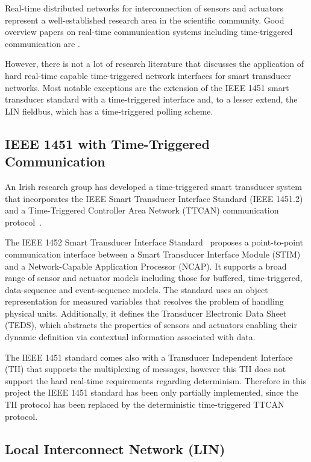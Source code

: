 \documentclass[11pt,a4paper,]{article}
\begin{document}
Real-time distributed networks for interconnection of sensors and
actuators represent a well-established research area in the
scientific community. Good overview papers on real-time
communication systems including time-triggered communication are
\cite{rushby03:buscompare,zurawski:05:ict,berge:00,jordan:95}.

However, there is not a lot of research literature that discusses
the application of hard real-time capable time-triggered network
interfaces for smart transducer networks. Most notable exceptions
are the extension of the IEEE 1451 smart transducer standard with
a time-triggered interface and, to a lesser extend, the LIN fieldbus, which has a time-triggered polling
scheme.

\subsection{IEEE 1451 with Time-Triggered Communication}

An Irish research group has developed a time-triggered smart
transducer system that incorporates the IEEE Smart Transducer
Interface Standard (IEEE 1451.2) and a Time-Triggered Controller
Area Network (TTCAN) communication protocol~\cite{doyle:02}.

The IEEE 1452 Smart Transducer Interface Standard~\cite{conway:00}
proposes a point-to-point communication interface between a Smart
Transducer Interface Module (STIM) and a Network-Capable
Application Processor (NCAP). It supports a broad range of sensor
and actuator models including those for buffered, time-triggered,
data-sequence and event-sequence models. The standard uses an
object representation for measured variables that resolves the
problem of handling physical units. Additionally, it defines the
Transducer Electronic Data Sheet (TEDS), which abstracts the
properties of sensors and actuators enabling their dynamic
definition via contextual information associated with data.

The IEEE 1451 standard comes also with a Transducer Independent
Interface (TII) that supports the multiplexing of messages, however
this TII does not support the hard real-time requirements regarding
determinism. Therefore in this project the IEEE 1451 standard has
been only partially implemented, since the TII protocol has been
replaced by the deterministic time-triggered TTCAN protocol.

\subsection{Local Interconnect Network (LIN)}
\end{document}
